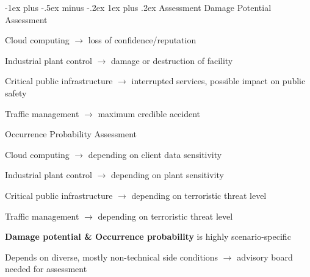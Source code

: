 \documentclass[a4paper]{article}
\makeatletter
\renewcommand{\note}[2]{\begin{noteBox} \textbf{#1} #2 \end{noteBox}}
\renewcommand{\subsubsection}{\@startsection{subsubsection}{3}{0mm}%
                {-1ex plus -.5ex minus -.2ex}%
                {1ex plus .2ex}%
                {\normalfont\small\bfseries}}
\makeatother
\begin{document}
\begin{multicols}{3}
    \subsubsection{Assessment}
    Damage Potential Assessment
    \begin{itemize*}
        \item Cloud computing $\rightarrow$ loss of confidence/reputation
        \item Industrial plant control $\rightarrow$ damage or destruction of facility
        \item Critical public infrastructure $\rightarrow$ interrupted services, possible impact on public safety
        \item Traffic management $\rightarrow$ maximum credible accident
    \end{itemize*}
    Occurrence Probability Assessment
    \begin{itemize*}
        \item Cloud computing $\rightarrow$ depending on client data sensitivity
        \item Industrial plant control $\rightarrow$ depending on plant sensitivity
        \item Critical public infrastructure $\rightarrow$ depending on terroristic threat level
        \item Traffic management $\rightarrow$ depending on terroristic threat level
    \end{itemize*}

    \note{Damage potential \& Occurrence probability}{is highly scenario-specific}

    Depends on diverse, mostly non-technical side conditions $\rightarrow$ advisory board needed for assessment


\end{multicols}
\end{document}
